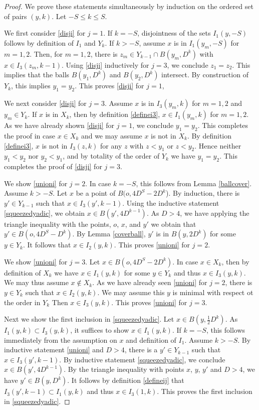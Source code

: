 \begin{proof}
We prove these statements simultaneously by induction on the ordered set of pairs $(y,k)$.
Let $-S\le k\le S$.

We first consider \eqref{disji} for $j=1$.
If $k=-S$, disjointness of the sets $I_1(y,-S)$ follows by definition of $I_1$ and $Y_k$. If $k>-S$,
assume $x$ is in $I_1(y_m,-S)$ for $m=1,2$.
Then, for $m=1,2$, there is $z_m\in Y_{k-1}\cap B(y_m,D^k)$ with $x\in I_3(z_m,k-1)$.
Using \eqref{disji} inductively for $j=3$, we
conclude $z_1=z_2$. This implies that the balls
$B(y_1, D^k)$ and $B(y_2, D^k)$ intersect. By construction of $Y_k$, this implies $y_1=y_2$.
This proves \eqref{disji} for $j=1$,

We next consider \eqref{disji} for $j=3$.
Assume $x$ is in $I_3(y_m,k)$ for $m=1,2$ and $y_m\in Y_k$. If $x$ is in $X_k$, then by definition
\eqref{definei3}, $x\in I_1(y_m,k)$ for $m=1,2$.
As we have already shown \eqref{disji} for $j=1$,
we conclude $y_1=y_2$. This completes the proof in
case $x\in X_k$ and we may assume $x$ is not in $X_k$. By definition \eqref{definei3}, $x$ is not
in $I_3(z,k)$  for any $z$ with $z<y_1$ or $z<y_2$.
Hence neither $y_1<y_2$ nor $y_2<y_1$, and by totality
of the order of $Y_k$ we have $y_1=y_2$. This completes the proof of \eqref{disji} for $j=3$.

We  show \eqref{unioni}  for $j=2$.
In case $k=-S$, this follows from Lemma \ref{ballcover}.
Assume  $k>-S$. Let $x$ be a point of $B(o, 4D^S-2D^k$).
By induction, there is $y'\in Y_{k-1}$ such that
$x\in I_3(y',k-1)$. Using the inductive statement
\eqref{squeezedyadic}, we obtain $x\in B(y',4D^{k-1})$.
As $D>4$, we have applying the triangle inequality with
the points, $o$, $x$, and $y'$ we obtain that  $y'\in B(o, 4D^S-D^k)$.
By Lemma \ref{coverball}, $y'$ is in $B(y,2D^k)$
for some $y\in Y_k$. It follows that  $x\in I_2(y,k)$.
This proves \eqref{unioni}  for $j=2$.

We  show \eqref{unioni} for $j=3$.
Let $x\in  B(o, 4D^S-2D^k)$. In case $x\in X_k$,
    then by definition of $X_k$ we have $x\in I_1(y,k)$ for some $y\in Y_k$ and thus $x\in I_3(y,k)$. We may thus assume $x\not\in X_k$. As we have already seen
\eqref{unioni} for $j=2$,
    there is $y\in Y_k$ such that $x\in I_2(y,k)$.
We may assume this $y$ is minimal with respect ot the order in $Y_k$
Then $x\in I_3(y,k)$.
    This proves \eqref{unioni}  for $j=3$.

Next we  show the first inclusion in \eqref{squeezedyadic}.
Let $x\in B(y,\frac 1{2}D^k)$.
As $I_1(y,k)\subset I_3(y,k)$,
it suffices to show $x\in I_1(y,k)$.
If $k=-S$, this follows immediately from
the assumption on $x$ and definition of $I_1$.
Assume $k>-S$. By inductive statement \eqref{unioni}
and $D>4$, there is a
$y'\in Y_{k-1}$ such that $x\in I_3(y',k-1)$.
By inductive statement \eqref{squeezedyadic},
we conclude $x\in B(y',4D^{k-1})$.
By the triangle inequality with points $x$, $y$, $y'$ and $D>4$, we have
$y'\in B(y,D^k)$. It follows by definition
\eqref{defineij} that
$I_3(y',k-1)\subset I_1(y,k)$ and thus
$x\in I_3(1,k)$. This proves the first inclusion
in \eqref{squeezedyadic}.



\end{proof}
